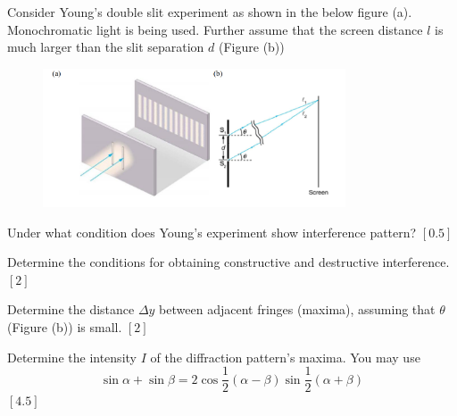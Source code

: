 \begin{problem}
    Consider Young’s double slit experiment as shown in the below figure (a). Monochromatic light is being used. Further assume that the screen distance $l$ is much larger than the slit separation $d$ (Figure (b))
    \begin{figure}[h]
        \centering
        \includegraphics[width = 0.8\textwidth]{spho_book_TYS_images/2021SPhO_10.png}
    \end{figure}
    \begin{subproblemalph}
        \item Under what condition does Young’s experiment show interference pattern? \hfill $[0.5]$
        \item Determine the conditions for obtaining constructive and destructive interference. \hfill $[2]$
        \item Determine the distance $\Delta y$ between adjacent fringes (maxima), assuming that $\theta$ (Figure (b)) is small. \hfill $[2]$
        \item Determine the intensity $I$ of the diffraction pattern’s maxima. You may use \[\sin\alpha + \sin\beta = 2 \cos\frac{1}{2}\left(\alpha-\beta\right)\sin\frac{1}{2}\left(\alpha+\beta\right)\] \hfill $[4.5]$
    \end{subproblemalph}
\end{problem}

